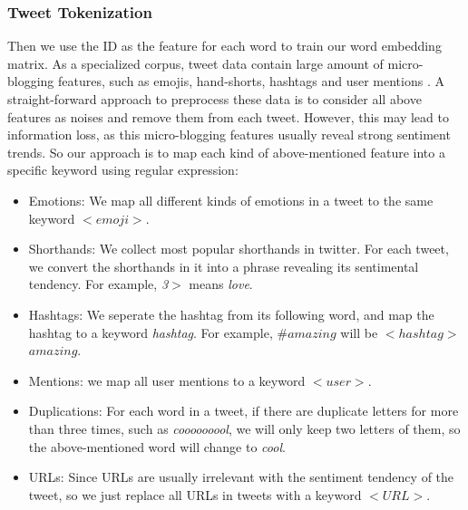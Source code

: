 \subsubsection {Tweet Tokenization}
%
Then we use the ID as the feature for each word to train our word embedding matrix.
%
As a specialized corpus, tweet data contain large amount of micro-blogging features, such as emojis, hand-shorts, hashtags and user mentions \cite{kouloumpis2011twitter}.
%
A straight-forward approach to preprocess these data is to consider all above features as noises and remove them from each tweet.
%
However, this may lead to information loss, as this micro-blogging features usually reveal strong sentiment trends.
%
So our approach is to map each kind of above-mentioned feature into a specific keyword using regular expression:
\begin{itemize}
\item Emotions: We map all different kinds of emotions in a tweet to the same keyword ${<emoji>}$.
\item Shorthands: We collect most popular shorthands in twitter. For each tweet, we convert the shorthands in it into a phrase revealing its sentimental tendency. For example, \emph{3$>$} means \emph{love}.
\item Hashtags: We seperate the hashtag from its following word, and map the hashtag to a keyword \emph{hashtag}. For example, $\# amazing$ will be $<hashtag>$ $amazing$.
\item Mentions: we map all user mentions to a keyword ${<user>}$. 
\item Duplications: For each word in a tweet, if there are duplicate letters for more than three times, such as \emph{cooooooool}, we will only keep two letters of them, so the above-mentioned word will change to \emph{cool}.
\item URLs: Since URLs are usually irrelevant with the sentiment tendency of the tweet, so we just replace all URLs in tweets with a keyword $<URL>$.
\end{itemize} 


